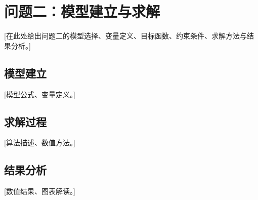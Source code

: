 \section{问题二：模型建立与求解}

[在此处给出问题二的模型选择、变量定义、目标函数、约束条件、求解方法与结果分析。]

\subsection{模型建立}

[模型公式、变量定义。]

\subsection{求解过程}

[算法描述、数值方法。]

\subsection{结果分析}

[数值结果、图表解读。]

